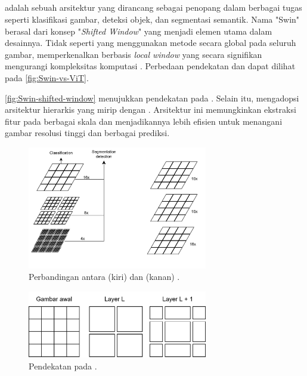 \subsection{\swin}
\label{subsec:swin}

\swin{} adalah sebuah arsitektur \vitfull{} yang dirancang sebagai penopang dalam berbagai tugas \cv{} seperti klasifikasi gambar, deteksi objek, dan segmentasi semantik. Nama "Swin" berasal dari konsep
"\emph{Shifted Window}" yang menjadi elemen utama dalam desainnya. Tidak seperti \vit{} yang menggunakan metode \selfattention{} secara global
pada seluruh gambar, \swin{} memperkenalkan \selfattention{} berbasis \emph{local window} yang secara signifikan mengurangi kompleksitas komputasi \parencite{liu2021swin}. Perbedaan pendekatan \swin{} dan \vit{} dapat dilihat pada \autoref{fig:Swin-vs-ViT}. 

\autoref{fig:Swin-shifted-window} menujukkan pendekatan \shiftedwindow{} pada \swin. Selain itu, \swin{} mengadopsi arsitektur hierarkis yang mirip dengan \cnn. Arsitektur ini memungkinkan ekstraksi fitur pada berbagai skala dan menjadikannya lebih efisien untuk menangani gambar resolusi tinggi dan berbagai prediksi.

\begin{figure}[htbp]
    \centering
    \includegraphics[width=0.7\textwidth]{images/swin-vit.png}
    \caption{Perbandingan antara \swin{} (kiri) dan \vit{} (kanan) \parencite{liu2021swin}.}
    \label{fig:Swin-vs-ViT}
\end{figure}

\begin{figure}[htbp]
    \centering
    \includegraphics[width=0.7\textwidth]{images/swin-shifted-window.png}
    \caption{Pendekatan \shiftedwindow{} pada \swin{} \parencite{liu2021swin}.}
    \label{fig:Swin-shifted-window}
\end{figure}

